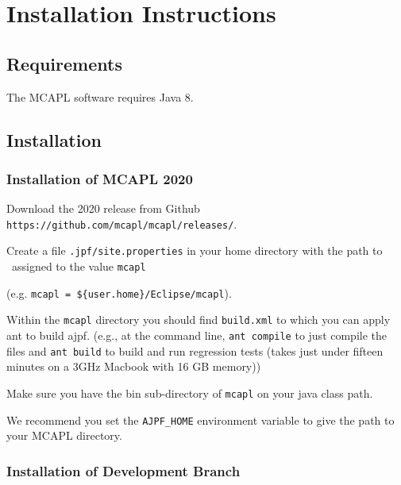 \chapter{Installation Instructions}
\label{chap:installation}
\section{Requirements}

The MCAPL software requires Java 8.   

\section{Installation}

\subsection{Installation of MCAPL 2020}

\begin{itemize}
\begin{sloppypar}
\item Download the 2020 release from Github \texttt{https://github.com/mcapl/mcapl/releases/}.
\end{sloppypar}
\item Create a file \texttt{.jpf/site.properties} in your home directory with the path to \ajpfversion\ assigned to the value \texttt{mcapl}

  (e.g. \texttt{mcapl = \$\{user.home\}/Eclipse/mcapl}).
\item Within the \texttt{mcapl} directory you should find \texttt{build.xml} to which you can apply ant to build ajpf. (e.g., at the command line, \lstinline{ant compile} to just compile the files and \lstinline{ant build} to build and run regression tests (takes just under fifteen minutes on a 3GHz Macbook with 16 GB memory))
\item Make sure you have the bin sub-directory of \texttt{mcapl} on your java class path.
\item We recommend you set the \texttt{AJPF\_HOME} environment variable to give the path to your MCAPL directory.
\end{itemize}

\subsection{Installation of Development Branch}

